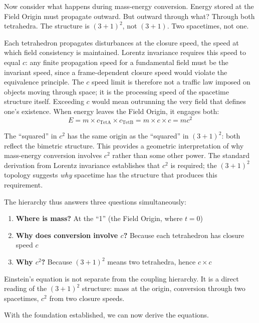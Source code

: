 \documentclass[aps,prd,preprint,superscriptaddress,showpacs,preprintnumbers,amsmath,amssymb,nofootinbib]{revtex4-2}
\begin{document}
Now consider what happens during mass-energy conversion. Energy stored at the Field Origin must propagate outward. But outward through what? Through both tetrahedra. The structure is $(3+1)^2$, not $(3+1)$. Two spacetimes, not one.

Each tetrahedron propagates disturbances at the closure speed, the speed at which field consistency is maintained. Lorentz invariance requires this speed to equal $c$: any finite propagation speed for a fundamental field must be the invariant speed, since a frame-dependent closure speed would violate the equivalence principle. The $c$ speed limit is therefore not a traffic law imposed on objects moving through space; it is the processing speed of the spacetime structure itself. Exceeding $c$ would mean outrunning the very field that defines one's existence. When energy leaves the Field Origin, it engages both:
\begin{equation}
E = m \times c_{\text{TetA}} \times c_{\text{TetB}} = m \times c \times c = mc^2
\end{equation}

The ``squared'' in $c^2$ has the same origin as the ``squared'' in $(3+1)^2$: both reflect the bimetric structure. This provides a geometric interpretation of why mass-energy conversion involves $c^2$ rather than some other power. The standard derivation from Lorentz invariance establishes that $c^2$ is required; the $(3+1)^2$ topology suggests \emph{why} spacetime has the structure that produces this requirement.

The hierarchy thus answers three questions simultaneously:
\begin{enumerate}
\item \textbf{Where is mass?} At the ``1'' (the Field Origin, where $t = 0$)
\item \textbf{Why does conversion involve $c$?} Because each tetrahedron has closure speed $c$
\item \textbf{Why $c^2$?} Because $(3+1)^2$ means two tetrahedra, hence $c \times c$
\end{enumerate}

Einstein's equation is not separate from the coupling hierarchy. It is a direct reading of the $(3+1)^2$ structure: mass at the origin, conversion through two spacetimes, $c^2$ from two closure speeds.

With the foundation established, we can now derive the equations.

\end{document}
